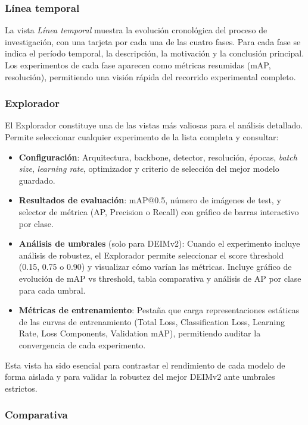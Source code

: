 \subsubsection{Línea temporal}

La vista \textit{Línea temporal} muestra la evolución cronológica del proceso de investigación, con una tarjeta por cada una de las cuatro fases. Para cada fase se indica el período temporal, la descripción, la motivación y la conclusión principal. Los experimentos de cada fase aparecen como métricas resumidas (mAP, resolución), permitiendo una visión rápida del recorrido experimental completo.

\subsubsection{Explorador}

El Explorador constituye una de las vistas más valiosas para el análisis detallado. Permite seleccionar cualquier experimento de la lista completa y consultar:

\begin{itemize}
    \item \textbf{Configuración}: Arquitectura, backbone, detector, resolución, épocas, \textit{batch size}, \textit{learning rate}, optimizador y criterio de selección del mejor modelo guardado.
    \item \textbf{Resultados de evaluación}: mAP@0.5, número de imágenes de test, y selector de métrica (AP, Precision o Recall) con gráfico de barras interactivo por clase.
    \item \textbf{Análisis de umbrales} (solo para DEIMv2): Cuando el experimento incluye análisis de robustez, el Explorador permite seleccionar el score threshold (0.15, 0.75 o 0.90) y visualizar cómo varían las métricas. Incluye gráfico de evolución de mAP vs threshold, tabla comparativa y análisis de AP por clase para cada umbral.
    \item \textbf{Métricas de entrenamiento}: Pestaña que carga representaciones estáticas de las curvas de entrenamiento (Total Loss, Classification Loss, Learning Rate, Loss Components, Validation mAP), permitiendo auditar la convergencia de cada experimento.
\end{itemize}

Esta vista ha sido esencial para contrastar el rendimiento de cada modelo de forma aislada y para validar la robustez del mejor DEIMv2 ante umbrales estrictos.

\subsubsection{Comparativa}

